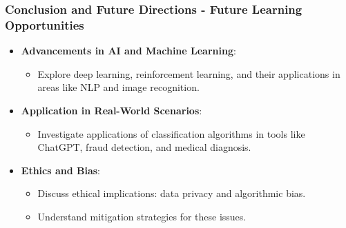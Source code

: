 \documentclass[aspectratio=169]{beamer}
\begin{document}
\begin{frame}[fragile]
    \frametitle{Conclusion and Future Directions - Future Learning Opportunities}
    \begin{itemize}
        \item \textbf{Advancements in AI and Machine Learning}:
        \begin{itemize}
            \item Explore deep learning, reinforcement learning, and their applications in areas like NLP and image recognition.
        \end{itemize}
        
        \item \textbf{Application in Real-World Scenarios}:
        \begin{itemize}
            \item Investigate applications of classification algorithms in tools like ChatGPT, fraud detection, and medical diagnosis.
        \end{itemize}
        
        \item \textbf{Ethics and Bias}:
        \begin{itemize}
            \item Discuss ethical implications: data privacy and algorithmic bias.
            \item Understand mitigation strategies for these issues.
        \end{itemize}
    \end{itemize}
\end{frame}
\end{document}
